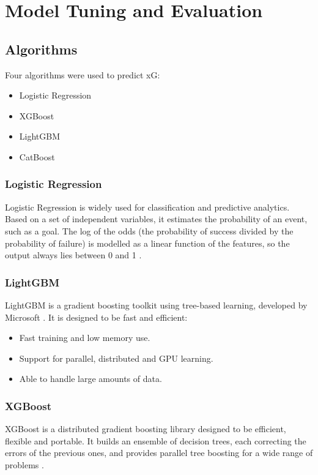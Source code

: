 \newpage

\section{Model Tuning and Evaluation}\label{test}

\subsection{Algorithms}

Four algorithms were used to predict xG:

\begin{itemize}
    \item Logistic Regression
    \item XGBoost
    \item LightGBM
    \item CatBoost
\end{itemize}

\subsubsection{Logistic Regression}
Logistic Regression is widely used for classification and predictive analytics. Based on a set of independent variables, it estimates the probability of an event, such as a goal. The log of the odds (the probability of success divided by the probability of failure) is modelled as a linear function of the features, so the output always lies between 0 and 1 \cite{1194264}.

\subsubsection{LightGBM}
LightGBM is a gradient boosting toolkit using tree-based learning, developed by Microsoft \cite{ke2017lightgbm}. It is designed to be fast and efficient:

\begin{itemize}
    \item Fast training and low memory use.
    \item Support for parallel, distributed and GPU learning.
    \item Able to handle large amounts of data.
\end{itemize}

\subsubsection{XGBoost}
XGBoost is a distributed gradient boosting library designed to be efficient, flexible and portable. It builds an ensemble of decision trees, each correcting the errors of the previous ones, and provides parallel tree boosting for a wide range of problems \cite{Chen:2016:XST:2939672.2939785}.

